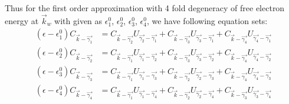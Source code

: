 \documentclass[notitlepage]{revtex4-1}
\begin{document}
\begin{CJK}{UTF8}{bsmi}
\begin{enumerate}
	Thus for the first order approximation with 4 fold degeneracy of free electron energy at $\vec{k}_w$ with given as $\epsilon^{0}_{1}$, $\epsilon^{0}_{2}$, $\epsilon^{0}_{3}$, $\epsilon^{0}_{4}$, we have following equation sets:
	\begin{align*}
		\left( \epsilon - \epsilon^{0}_{1} \right) C_{\vec{k} - \vec{\gamma_{1}}}  &= C_{\vec{k}-\vec{\gamma_{2}}} U_{\vec{\gamma_{2}}-\vec{\gamma_{1}}} 
		                                                                            + C_{\vec{k}-\vec{\gamma_{3}}} U_{\vec{\gamma_{3}}-\vec{\gamma_{1}}} 
		                                                                            + C_{\vec{k}-\vec{\gamma_{4}}} U_{\vec{\gamma_{4}}-\vec{\gamma_{1}}} \\
		\left( \epsilon - \epsilon^{0}_{2} \right) C_{\vec{k} - \vec{\gamma_{2}}}  &= C_{\vec{k}-\vec{\gamma_{1}}} U_{\vec{\gamma_{1}}-\vec{\gamma_{2}}} 
																				    + C_{\vec{k}-\vec{\gamma_{3}}} U_{\vec{\gamma_{3}}-\vec{\gamma_{2}}} 
																				    + C_{\vec{k}-\vec{\gamma_{4}}} U_{\vec{\gamma_{4}}-\vec{\gamma_{2}}} \\
		\left( \epsilon - \epsilon^{0}_{3} \right) C_{\vec{k} - \vec{\gamma_{3}}}  &= C_{\vec{k}-\vec{\gamma_{1}}} U_{\vec{\gamma_{1}}-\vec{\gamma_{3}}} 
																					+ C_{\vec{k}-\vec{\gamma_{2}}} U_{\vec{\gamma_{2}}-\vec{\gamma_{3}}} 
																					+ C_{\vec{k}-\vec{\gamma_{4}}} U_{\vec{\gamma_{4}}-\vec{\gamma_{3}}} \\
		\left( \epsilon - \epsilon^{0}_{4} \right) C_{\vec{k} - \vec{\gamma_{4}}}  &= C_{\vec{k}-\vec{\gamma_{1}}} U_{\vec{\gamma_{1}}-\vec{\gamma_{4}}} 
																					+ C_{\vec{k}-\vec{\gamma_{2}}} U_{\vec{\gamma_{2}}-\vec{\gamma_{4}}} 
																					+ C_{\vec{k}-\vec{\gamma_{3}}} U_{\vec{\gamma_{3}}-\vec{\gamma_{4}}} \\
	\end{align*}  
	

\end{enumerate}
\end{CJK}
\end{document}

